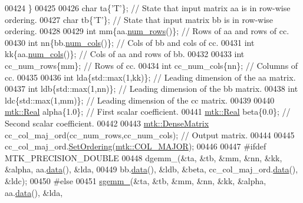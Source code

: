 \begin{DoxyCode}
00424   \}
00425 
00426   \textcolor{keywordtype}{char} ta\{\textcolor{charliteral}{'T'}\}; \textcolor{comment}{// State that input matrix aa is in row-wise ordering.}
00427   \textcolor{keywordtype}{char} tb\{\textcolor{charliteral}{'T'}\}; \textcolor{comment}{// State that input matrix bb is in row-wise ordering.}
00428 
00429   \textcolor{keywordtype}{int} mm\{aa.\hyperlink{classmtk_1_1DenseMatrix_a17d8d3b9cc0926044b6972dd190a5c21}{num\_rows}()\};  \textcolor{comment}{// Rows of aa and rows of cc.}
00430   \textcolor{keywordtype}{int} nn\{bb.\hyperlink{classmtk_1_1DenseMatrix_af6f78373aaf2136f0c78974d7c8de0a8}{num\_cols}()\};  \textcolor{comment}{// Cols of bb and cols of cc.}
00431   \textcolor{keywordtype}{int} kk\{aa.\hyperlink{classmtk_1_1DenseMatrix_af6f78373aaf2136f0c78974d7c8de0a8}{num\_cols}()\};  \textcolor{comment}{// Cols of aa and rows of bb.}
00432 
00433   \textcolor{keywordtype}{int} cc\_num\_rows\{mm\};  \textcolor{comment}{// Rows of cc.}
00434   \textcolor{keywordtype}{int} cc\_num\_cols\{nn\};  \textcolor{comment}{// Columns of cc.}
00435 
00436   \textcolor{keywordtype}{int} lda\{std::max(1,kk)\};  \textcolor{comment}{// Leading dimension of the aa matrix.}
00437   \textcolor{keywordtype}{int} ldb\{std::max(1,nn)\};  \textcolor{comment}{// Leading dimension of the bb matrix.}
00438   \textcolor{keywordtype}{int} ldc\{std::max(1,mm)\};  \textcolor{comment}{// Leading dimension of the cc matrix.}
00439 
00440   \hyperlink{group__c01-roots_gac080bbbf5cbb5502c9f00405f894857d}{mtk::Real} alpha\{1.0\}; \textcolor{comment}{// First scalar coefficient.}
00441   \hyperlink{group__c01-roots_gac080bbbf5cbb5502c9f00405f894857d}{mtk::Real} beta\{0.0\};  \textcolor{comment}{// Second scalar coefficient.}
00442 
00443   \hyperlink{classmtk_1_1DenseMatrix}{mtk::DenseMatrix} cc\_col\_maj\_ord(cc\_num\_rows,cc\_num\_cols); \textcolor{comment}{// Output matrix.}
00444 
00445   cc\_col\_maj\_ord.\hyperlink{classmtk_1_1DenseMatrix_aacae136ae446cad8f0d81476e83efb39}{SetOrdering}(\hyperlink{namespacemtk_ga622801bd9f912d0f976c3e383f5f581ca7c11989c132253fb76b8f6b1314f7e13}{mtk::COL\_MAJOR});
00446 
00447 \textcolor{preprocessor}{  #ifdef MTK\_PRECISION\_DOUBLE}
00448   dgemm\_(&ta, &tb, &mm, &nn, &kk, &alpha, aa.\hyperlink{classmtk_1_1DenseMatrix_a16b3ff56feb2658b9fc7147d1de4d8e7}{data}(), &lda,
00449          bb.\hyperlink{classmtk_1_1DenseMatrix_a16b3ff56feb2658b9fc7147d1de4d8e7}{data}(), &ldb, &beta, cc\_col\_maj\_ord.\hyperlink{classmtk_1_1DenseMatrix_a16b3ff56feb2658b9fc7147d1de4d8e7}{data}(), &ldc);
00450 \textcolor{preprocessor}{  #else}
00451   \hyperlink{namespacemtk_adb7c0560326b8e57f255e58b87ec76b0}{sgemm\_}(&ta, &tb, &mm, &nn, &kk, &alpha, aa.\hyperlink{classmtk_1_1DenseMatrix_a16b3ff56feb2658b9fc7147d1de4d8e7}{data}(), &lda,

\end{DoxyCode}
